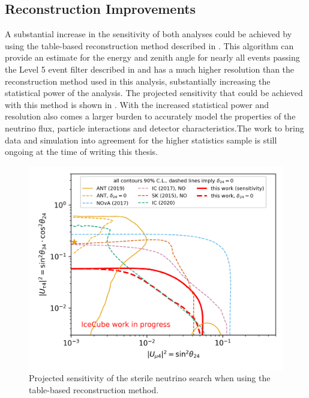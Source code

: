 \subsection{Reconstruction Improvements}
A substantial increase in the sensitivity of both analyses could be achieved by using the table-based reconstruction method described in \cite{lowen-reco-paper}. This algorithm can provide an estimate for the energy and zenith angle for nearly all events passing the Level 5 event filter described in  and has a much higher resolution than the reconstruction method used in this analysis, substantially increasing the statistical power of the analysis. The projected sensitivity that could be achieved with this method is shown in . With the increased statistical power and resolution also comes a larger burden to accurately model the properties of the neutrino flux, particle interactions and detector characteristics.The work to bring data and simulation into agreement for the higher statistics sample is still ongoing at the time of writing this thesis.
\begin{figure}
    \centering
    \includegraphics[width=0.9\linewidth]{figures/summary/Sterile_mixing_sensitivity_90pct_retro.png}
    \caption{Projected sensitivity of the sterile neutrino search when using the table-based reconstruction method.\label{fig:retro-sensitivity}}
\end{figure}

